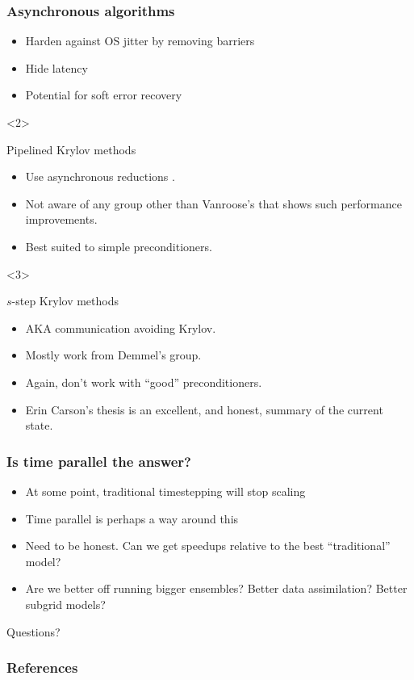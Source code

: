 \documentclass[presentation]{beamer}
\begin{document}
\begin{frame}[t]
  \frametitle{Asynchronous algorithms}
  \begin{itemize}
  \item Harden against OS jitter by removing barriers
  \item Hide latency
  \item Potential for soft error recovery
  \end{itemize}

  \begin{onlyenv}<2>
    \begin{block}{Pipelined Krylov methods}
      \begin{itemize}
      \item Use asynchronous reductions \textcite{Ghysels:2013a}.
      \item Not aware of any group other than Vanroose's that shows
        such performance improvements.
      \item Best suited to simple preconditioners.
      \end{itemize}
    \end{block}
  \end{onlyenv}

  \begin{onlyenv}<3>
    \begin{block}{$s$-step Krylov methods}
      \begin{itemize}
      \item AKA communication avoiding Krylov.
      \item Mostly work from Demmel's group.
      \item Again, don't work with ``good'' preconditioners.
      \item Erin Carson's thesis \parencite{Carson:2015} is an
        excellent, and honest, summary of the current state.
      \end{itemize}
    \end{block}
  \end{onlyenv}
\end{frame}

\begin{frame}
  \frametitle{Is time parallel the answer?}
  \begin{itemize}
  \item At some point, traditional timestepping will stop scaling
  \item Time parallel is perhaps a way around this
  \item Need to be honest.  Can we get speedups relative to the best
    ``traditional'' model?
  \item Are we better off running bigger ensembles?  Better data
    assimilation?  Better subgrid models?
  \end{itemize}
\end{frame}

\begin{frame}[standout]
  Questions?
\end{frame}

\appendix

\begin{frame}[allowframebreaks]
  \frametitle{References}
  
  \printbibliography[heading=none]
\end{frame}
\end{document}
